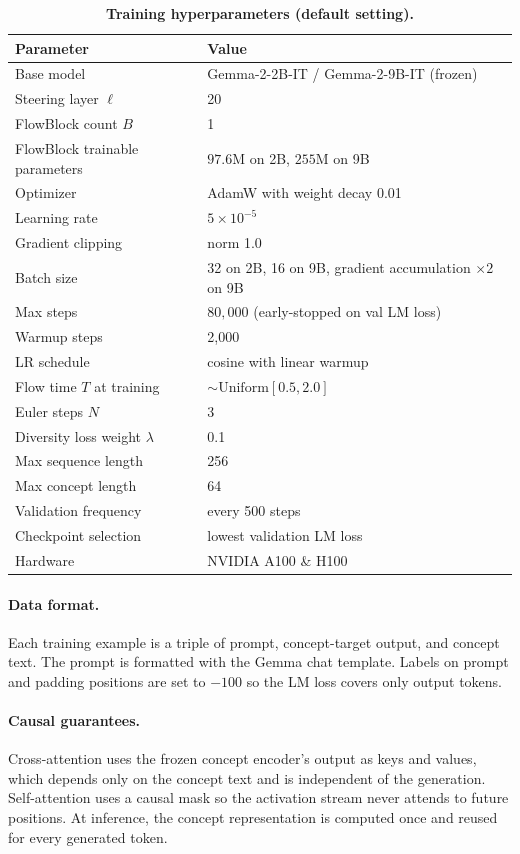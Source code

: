 \documentclass{article}
\begin{document}
\begin{table}[htbp]
\centering
\small
\begin{tabular}{ll}
\toprule
\textbf{Parameter} & \textbf{Value} \\
\midrule
Base model & Gemma-2-2B-IT / Gemma-2-9B-IT (frozen) \\
Steering layer $\ell$ & 20 \\
FlowBlock count $B$ & 1 \\
FlowBlock trainable parameters & $97.6$M on 2B, $255$M on 9B \\
\midrule
Optimizer & AdamW with weight decay 0.01 \\
Learning rate & $5 \times 10^{-5}$ \\
Gradient clipping & norm 1.0 \\
Batch size & 32 on 2B, 16 on 9B, gradient accumulation $\times 2$ on 9B \\
Max steps & $80{,}000$ (early-stopped on val LM loss) \\
Warmup steps & 2{,}000 \\
LR schedule & cosine with linear warmup \\
\midrule
Flow time $T$ at training & $\sim \text{Uniform}[0.5, 2.0]$ \\
Euler steps $N$ & 3 \\
Diversity loss weight $\lambda$ & 0.1 \\
\midrule
Max sequence length & 256 \\
Max concept length & 64 \\
Validation frequency & every 500 steps \\
Checkpoint selection & lowest validation LM loss \\
Hardware & NVIDIA A100 \& H100 \\
\bottomrule
\end{tabular}
\caption{\textbf{Training hyperparameters (default setting).}}
\label{tab:hyperparams}
\end{table}

\paragraph{Data format.}
Each training example is a triple of prompt, concept-target output, and concept text. The prompt is formatted with the Gemma chat template. Labels on prompt and padding positions are set to $-100$ so the LM loss covers only output tokens.

\paragraph{Causal guarantees.}
Cross-attention uses the frozen concept encoder's output as keys and values, which depends only on the concept text and is independent of the generation. Self-attention uses a causal mask so the activation stream never attends to future positions. At inference, the concept representation is computed once and reused for every generated token.
\end{document}
